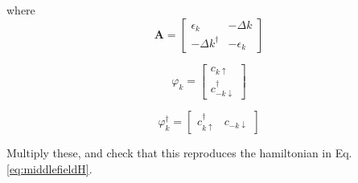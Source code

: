 where 
\begin{equation}
\textbf{A}  = 
\begin{bmatrix}
\epsilon_k  & - \Delta k \\
- \Delta k^{\dagger} & -\epsilon_k
\end{bmatrix}
\end{equation}

\begin{equation}
\varphi_k =  
\begin{bmatrix}
c_{k \uparrow} \\
c_{-k \downarrow}^{\dagger}
\end{bmatrix}
\end{equation}

\begin{equation}
\varphi_k^{\dagger} = 
\begin{bmatrix}
c_{k \uparrow}^{\dagger} & c_{-k \downarrow}
\end{bmatrix}
\end{equation}

Multiply these, and check that this reproduces the hamiltonian in Eq. \ref{eq:middlefieldH}. 